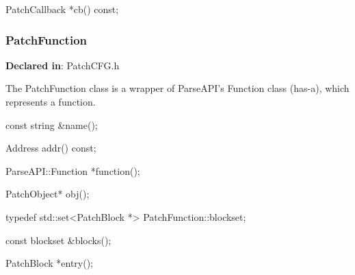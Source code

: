 
\begin{apient}
PatchCallback *cb() const;
\end{apient}



\subsubsection{PatchFunction}
\label{sec-3.2.9}

\textbf{Declared in}: PatchCFG.h

The PatchFunction class is a wrapper of ParseAPI's Function class (has-a), which
represents a function.

\begin{apient}
const string &name();
\end{apient}



\begin{apient}
Address addr() const;
\end{apient}



\begin{apient}
ParseAPI::Function *function();
\end{apient}




\begin{apient}
PatchObject* obj();
\end{apient}


\begin{apient}
typedef std::set<PatchBlock *> PatchFunction::blockset;

const blockset &blocks();
\end{apient}



\begin{apient}
PatchBlock *entry();
\end{apient}


